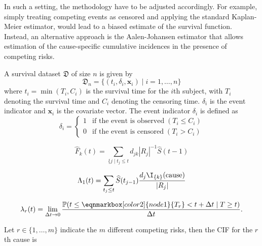 In such a setting, 
the methodology have to be adjusted accordingly.
For example, 
simply treating competing events as censored 
and applying the standard Kaplan-Meier estimator, 
would lead to a biased estimate of the survival function.
~\autocite{pepeKaplan1993}
Instead, an alternative approach is the Aalen-Johansen estimator
that allows estimation of the cause-specific cumulative incidences
in the presence of competing risks.
~\autocite{aalenEmpirical1978}

A survival dataset \(\mathfrak{D}\) of size \(n\) is given by
\begin{equation}
    \mathfrak{D}_n = \{(t_i, \delta_i, \mathbf{x}_i) \mid i = 1, \ldots, n\} 
\end{equation}
where \(t_i = \min(T_{i}, C_i) \) is the survival time 
for the \(i\)th subject,
with \(T_i\) denoting the survival time
and \(C_i\) denoting the censoring time. 
\(\delta_i\) is the event indicator 
and \(\mathbf{x}_i\) is the covariate vector.
The event indicator \(\delta_i\) is defined as
\begin{equation}
    \delta_i =
        \begin{cases}
            1 & \text{if the event is observed} \; (T_i \leq C_i)\\
            0 & \text{if the event is censored} \; (T_i >    C_i)
        \end{cases}
\end{equation}




\begin{equation}
    \widehat{F}_k (t) = 
    \sum_{\{j \mid t_j \leq t}
    d_{jk} |R_j|^{-1} \widehat{S}(t-1)
\end{equation}


\begin{equation}
    \Lambda_1(t) = \sum_{t_j \leq t} \widehat{S}(t_{j-1}) 
        \frac{d_j \I_{\{k\}}(\mathrm{cause})}{|R_j|}
\end{equation}

\vspace{5em}

\begin{equation}
    \lambda_r(t) = \lim_{\Delta t \to 0} 
        \frac{\PR (t \leq 
          \eqnmarkbox[color2]{node1}{T_r}
        < t + \Delta t \mid T \geq t)}{\Delta t}.
\end{equation}



Let \(r \in \{1, \ldots, m\}\) indicate the \(m\) different competing risks,
then the \ac{CIF} for the \(r\)th cause is

